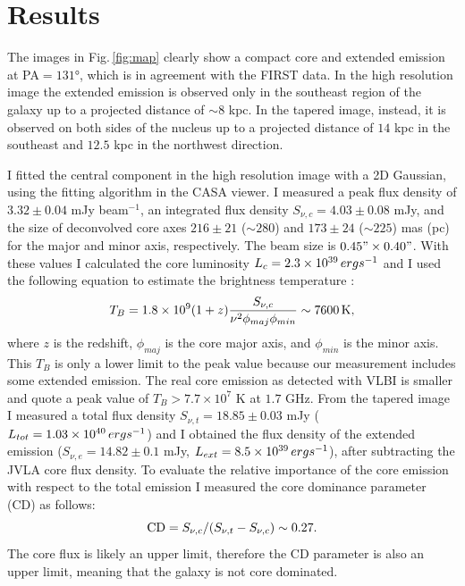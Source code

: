 \documentclass[../main.tex]{subfiles}
\begin{document}
\section{Results}
\label{sec:results}


The images in Fig.\,\ref{fig:map} clearly show a compact core and extended emission at PA$=\ang{131}$, which is in agreement with the FIRST data.
In the high resolution image the extended emission is observed only in the southeast region of the galaxy up to a projected distance of $\sim 8$ kpc.
In the tapered image, instead, it is observed on both sides of the nucleus up to a projected distance of $14$ kpc in the southeast and $12.5$ kpc in the northwest direction. 

I fitted the central component in the high resolution image with a 2D Gaussian, using the fitting algorithm in the CASA viewer.
I measured a peak flux density of $3.32\pm0.04$ mJy beam$^{-1}$, an integrated flux density $S_{\nu,c}=4.03\pm0.08$ mJy, and the size of deconvolved core axes $216\pm21$ ($\sim 280$) and $173\pm24$ ($\sim225$) mas (pc) for the major and minor axis, respectively.
The beam size is $0.45"\times0.40"$. 
With these values I calculated the core luminosity $L_{c}=2.3\times 10^{39}\,erg s^{-1}$ and I used the following equation to estimate the brightness temperature \citep{Doi13}: 
\begin{equation}
\label{eq:Tb}
T_B=1.8\times 10^9 (1+z)\frac{S_{\nu,c}}{\nu^2\phi_{maj}\phi_{min}}\sim7600 {\rm\, K},
\end{equation}
where $z$ is the redshift, $\phi_{maj}$ is the core major axis, and $\phi_{min}$ is the minor axis.
This $T_B$ is only a lower limit to the peak value because our measurement includes some extended emission.
The real core emission as detected with VLBI is smaller and \citet{Doi13} quote a peak value of $T_B>7.7\times 10^7$ K at $1.7$ GHz.
From the tapered image I measured a total flux density $S_{\nu,t} = 18.85 \pm 0.03$ mJy ($L_{tot}=1.03\times10^{40}\,erg s^{-1}$) and I obtained the flux density of the extended emission ($S_{\nu,e} = 14.82\pm0.1$ mJy, $L_{ext}=8.5\times10^{39}\,erg s^{-1}$), after subtracting the JVLA core flux density.
To evaluate the relative importance of the core emission with respect to the total emission I measured the core dominance parameter (CD) as follows:
\begin{equation}
\label{eq:cd}
{\rm CD}=S_{\nu,c}/(S_{\nu,t}-S_{\nu,c})\sim0.27.
\end{equation}
The core flux is likely an upper limit, therefore the CD parameter is also an upper limit, meaning that the galaxy is not core dominated.
\end{document}
